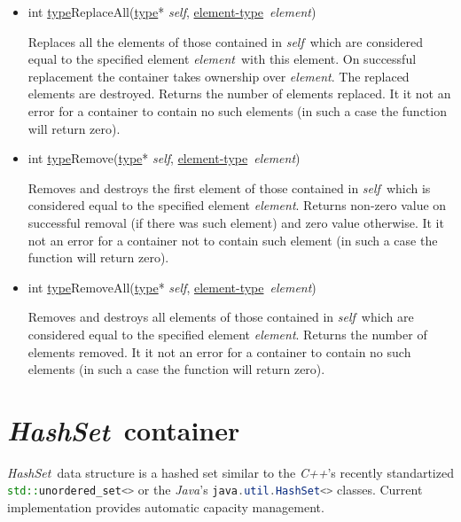 \documentclass[a4paper]{article}
\newcommand{\Cpp}{\emph{C++}}
\newcommand{\Java}{\emph{Java}}
\newcommand{\st}{\underline{type}}
\newcommand{\et}{\underline{element-type}}
\newcommand{\sv}{\emph{self}}
\newcommand{\ev}{\emph{element}}
\newcommand{\meth}[1]{#1}
\begin{document}
\begin{itemize}
Replaces the first element of those contained in \sv, which is considered equal to the specified element \ev, with this element.
On successful replacement the container takes ownership over \ev.
The replaced element is destroyed.
Returns non-zero value on successful replacement (if there was such element) and zero value otherwise.
It it not an error for a container not to contain such element (in such a case the function will return zero).


\item \meth{int \st ReplaceAll(\st* \sv, \et\ \ev)}


Replaces all the elements of those contained in \sv\ which are considered equal to the specified element \ev\ with this element.
On successful replacement the container takes ownership over \ev.
The replaced elements are destroyed.
Returns the number of elements replaced.
It it not an error for a container to contain no such elements (in such a case the function will return zero).


\item \meth{int \st Remove(\st* \sv, \et\ \ev)}


Removes and destroys the first element of those contained in \sv\ which is considered equal to the specified element \ev.
Returns non-zero value on successful removal (if there was such element) and zero value otherwise.
It it not an error for a container not to contain such element (in such a case the function will return zero).


\item \meth{int \st RemoveAll(\st* \sv, \et\ \ev)}


Removes and destroys all elements of those contained in \sv\ which are considered equal to the specified element \ev.
Returns the number of elements removed.
It it not an error for a container to contain no such elements (in such a case the function will return zero).


\end{itemize}




\newcommand{\Hashset}{\emph{HashSet}}
\section{\Hashset\ container}


\Hashset\ data structure is a hashed set similar to the \Cpp's recently standartized \lstinline[language=C++]{std::unordered_set<>} or the \Java's \lstinline[language=Java]{java.util.HashSet<>} classes.
Current implementation provides automatic capacity management.
\end{document}
